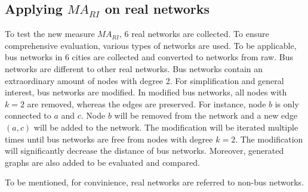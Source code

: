 \documentclass[12pt]{article}
\begin{document}
\subsection{Applying $MA_{RI}$ on real networks}
To test the new measure $MA_{RI}$, 6 real networks are collected. To ensure comprehensive evaluation, various types of networks are used. To be applicable, bus networks in 6 cities are collected and converted to networks from raw. Bus networks are different to other real networks. Bus networks contain an extraordinary amount of nodes with degree 2. For simplification and general interest, bus networks are modified. In modified bus networks, all nodes with $k=2$ are removed, whereas the edges are preserved. For instance, node $b$ is only connected to $a$ and $c$. Node $b$ will be removed from the network and a new edge $(a,c)$ will be added to the network. The modification will be iterated multiple times until bus networks are free from nodes with degree $k=2$. The modification will significantly decrease the distance of bus networks. Moreover, generated graphs are also added to be evaluated and compared.\par
To be mentioned, for convinience, real networks are referred to non-bus networks.
\end{document}
